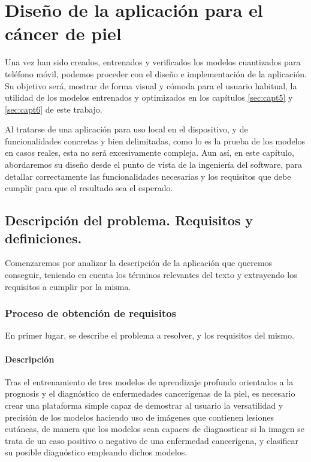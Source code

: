 \chapter{Diseño de la aplicación para el cáncer de piel}

Una vez han sido creados, entrenados y verificados los modelos cuantizados para teléfono móvil, podemos proceder con el diseño e implementación de la aplicación. Su objetivo será, mostrar de forma visual y cómoda para el usuario habitual, la utilidad de los modelos entrenados y optimizados en los capítulos \ref{sec:capt5} y  \ref{sec:capt6}  de este trabajo.

Al tratarse de una aplicación para uso local en el dispositivo, y de funcionalidades concretas y bien delimitadas, como lo es la prueba de los modelos en casos reales, esta no será excesivamente compleja. Aun así, en este capítulo, abordaremos su diseño desde el punto de vista de la ingeniería del software, para detallar correctamente las funcionalidades necesarias y los requisitos que debe cumplir para que el resultado sea el esperado.

\section{Descripción del problema. Requisitos y definiciones.}
\label{sec:descripcion}

Comenzaremos por analizar la descripción de la aplicación que queremos conseguir, teniendo en cuenta los términos relevantes del texto y extrayendo los requisitos a cumplir por la misma.

\subsection{Proceso de obtención de requisitos}

En  primer lugar, se describe el problema a resolver, y los requisitos del mismo.

\subsubsection{Descripción}
Tras el entrenamiento de tres modelos de aprendizaje profundo orientados a la prognosis y el diagnóstico de enfermedades cancerígenas de la piel, es necesario crear una plataforma simple capaz de demostrar al usuario la versatilidad y precisión de los modelos haciendo uso de imágenes que contienen lesiones cutáneas, de manera que los modelos sean capaces de diagnosticar si la imagen se trata de un caso positivo o negativo de una enfermedad cancerígena, y clasificar su posible diagnóstico empleando dichos modelos.

